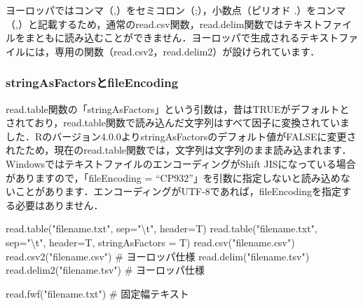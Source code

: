 \documentclass[
  letterpaper,
  DIV=11,
  numbers=noendperiod]{scrreprt}
\newenvironment{Shaded}{\begin{snugshade}}{\end{snugshade}}
\newcommand{\AttributeTok}[1]{\textcolor[rgb]{0.40,0.45,0.13}{#1}}
\newcommand{\CommentTok}[1]{\textcolor[rgb]{0.37,0.37,0.37}{#1}}
\newcommand{\FunctionTok}[1]{\textcolor[rgb]{0.28,0.35,0.67}{#1}}
\newcommand{\NormalTok}[1]{\textcolor[rgb]{0.00,0.23,0.31}{#1}}
\newcommand{\SpecialCharTok}[1]{\textcolor[rgb]{0.37,0.37,0.37}{#1}}
\newcommand{\StringTok}[1]{\textcolor[rgb]{0.13,0.47,0.30}{#1}}
\begin{document}
\begin{tcolorbox}[enhanced jigsaw, left=2mm, colframe=quarto-callout-tip-color-frame, opacitybacktitle=0.6, colbacktitle=quarto-callout-tip-color!10!white, opacityback=0, leftrule=.75mm, coltitle=black, bottomtitle=1mm, titlerule=0mm, bottomrule=.15mm, rightrule=.15mm, toptitle=1mm, breakable, arc=.35mm, toprule=.15mm, colback=white, title=\textcolor{quarto-callout-tip-color}{\faLightbulb}\hspace{0.5em}{ヨーロッパで準備されたファイルのデータ読み込み}]

ヨーロッパではコンマ（,）をセミコロン（;），小数点（ピリオド
.）をコンマ（,）と記載するため，通常のread.csv関数，read.delim関数ではテキストファイルをまともに読み込むことができません．ヨーロッパで生成されるテキストファイルには，専用の関数（read.csv2，read.delim2）が設けられています．

\end{tcolorbox}

\hypertarget{stringasfactorsux3068fileencoding}{%
\subsubsection{stringAsFactorsとfileEncoding}\label{stringasfactorsux3068fileencoding}}

read.table関数の「stringAsFactors」という引数は，昔はTRUEがデフォルトとされており，read.table関数で読み込んだ文字列はすべて因子に変換されていました．Rのバージョン4.0.0よりstringAsFactorsのデフォルト値がFALSEに変更されたため，現在のread.table関数では，文字列は文字列のまま読み込まれます．WindowsではテキストファイルのエンコーディングがShift
JISになっている場合がありますので，「fileEncoding =
``CP932''」を引数に指定しないと読み込めないことがあります．エンコーディングがUTF-8であれば，fileEncodingを指定する必要はありません．

\begin{Shaded}
\begin{Highlighting}[]
\FunctionTok{read.table}\NormalTok{(}\StringTok{"filename.txt"}\NormalTok{, }\AttributeTok{sep=}\StringTok{"}\SpecialCharTok{\textbackslash{}t}\StringTok{"}\NormalTok{, }\AttributeTok{header=}\NormalTok{T)}
\FunctionTok{read.table}\NormalTok{(}\StringTok{"filename.txt"}\NormalTok{, }\AttributeTok{sep=}\StringTok{"}\SpecialCharTok{\textbackslash{}t}\StringTok{"}\NormalTok{, }\AttributeTok{header=}\NormalTok{T, }\AttributeTok{stringAsFactors =}\NormalTok{ T)}
\FunctionTok{read.csv}\NormalTok{(}\StringTok{"filename.csv"}\NormalTok{)}
\FunctionTok{read.csv2}\NormalTok{(}\StringTok{"filename.csv"}\NormalTok{) }\CommentTok{\# ヨーロッパ仕様}
\FunctionTok{read.delim}\NormalTok{(}\StringTok{"filename.tsv"}\NormalTok{)}
\FunctionTok{read.delim2}\NormalTok{(}\StringTok{"filename.tsv"}\NormalTok{) }\CommentTok{\# ヨーロッパ仕様}

\FunctionTok{read.fwf}\NormalTok{(}\StringTok{"filename.txt"}\NormalTok{) }\CommentTok{\# 固定幅テキスト}
\end{Highlighting}
\end{Shaded}
\end{document}
